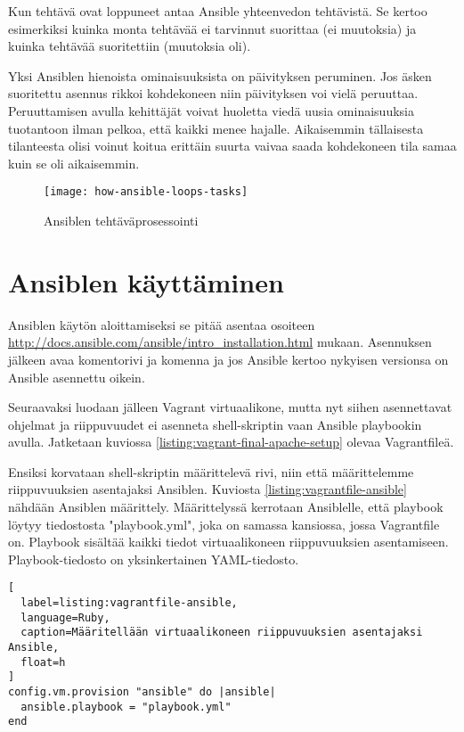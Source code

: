Kun tehtävä ovat loppuneet antaa Ansible yhteenvedon tehtävistä. Se kertoo esimerkiksi kuinka monta tehtävää ei tarvinnut suorittaa (ei muutoksia) ja kuinka tehtävää suoritettiin (muutoksia oli).

Yksi Ansiblen hienoista ominaisuuksista on päivityksen peruminen. Jos äsken suoritettu asennus rikkoi kohdekoneen niin päivityksen voi vielä peruuttaa. Peruuttamisen avulla kehittäjät voivat huoletta viedä uusia ominaisuuksia tuotantoon ilman pelkoa, että kaikki menee hajalle. Aikaisemmin tällaisesta tilanteesta olisi voinut koitua erittäin suurta vaivaa saada kohdekoneen tila samaa kuin se oli aikaisemmin.

\begin{figure}[h]
  \centering
  \texttt{[image: how-ansible-loops-tasks]}
  \caption{Ansiblen tehtäväprosessointi}
  \label{fig:how-ansible-loops-tasks}
\end{figure}

\section{Ansiblen käyttäminen}

Ansiblen käytön aloittamiseksi se pitää asentaa osoiteen \url{http://docs.ansible.com/ansible/intro_installation.html} mukaan. Asennuksen jälkeen avaa komentorivi ja komenna  ja jos Ansible kertoo nykyisen versionsa on Ansible asennettu oikein.

Seuraavaksi luodaan jälleen Vagrant virtuaalikone, mutta nyt siihen asennettavat ohjelmat ja riippuvuudet ei asenneta shell-skriptin vaan Ansible playbookin avulla. Jatketaan kuviossa \ref{listing:vagrant-final-apache-setup} olevaa Vagrantfileä.

Ensiksi korvataan shell-skriptin määrittelevä rivi, niin että määrittelemme riippuvuuksien asentajaksi Ansiblen. Kuviosta \ref{listing:vagrantfile-ansible} nähdään Ansiblen määrittely. Määrittelyssä kerrotaan Ansiblelle, että playbook löytyy tiedostosta "playbook.yml", joka on samassa kansiossa, jossa Vagrantfile on. Playbook sisältää kaikki tiedot virtuaalikoneen riippuvuuksien asentamiseen. Playbook-tiedosto on yksinkertainen YAML-tiedosto.

\begin{lstlisting}[
  label=listing:vagrantfile-ansible,
  language=Ruby,
  caption=Määritellään virtuaalikoneen riippuvuuksien asentajaksi Ansible,
  float=h
]
config.vm.provision "ansible" do |ansible|
  ansible.playbook = "playbook.yml"
end
\end{lstlisting}


